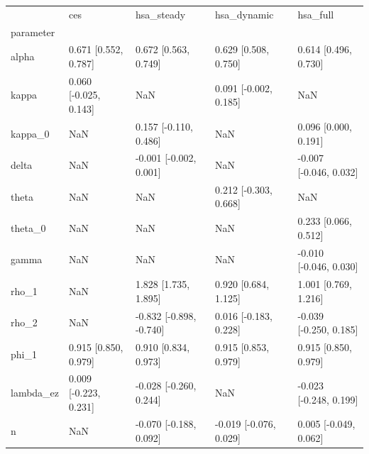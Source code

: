 \begin{tabular}{lllll}
\toprule
 & ces & hsa\_steady & hsa\_dynamic & hsa\_full \\
parameter &  &  &  &  \\
\midrule
alpha & 0.671 [0.552, 0.787] & 0.672 [0.563, 0.749] & 0.629 [0.508, 0.750] & 0.614 [0.496, 0.730] \\
kappa & 0.060 [-0.025, 0.143] & NaN & 0.091 [-0.002, 0.185] & NaN \\
kappa\_0 & NaN & 0.157 [-0.110, 0.486] & NaN & 0.096 [0.000, 0.191] \\
delta & NaN & -0.001 [-0.002, 0.001] & NaN & -0.007 [-0.046, 0.032] \\
theta & NaN & NaN & 0.212 [-0.303, 0.668] & NaN \\
theta\_0 & NaN & NaN & NaN & 0.233 [0.066, 0.512] \\
gamma & NaN & NaN & NaN & -0.010 [-0.046, 0.030] \\
rho\_1 & NaN & 1.828 [1.735, 1.895] & 0.920 [0.684, 1.125] & 1.001 [0.769, 1.216] \\
rho\_2 & NaN & -0.832 [-0.898, -0.740] & 0.016 [-0.183, 0.228] & -0.039 [-0.250, 0.185] \\
phi\_1 & 0.915 [0.850, 0.979] & 0.910 [0.834, 0.973] & 0.915 [0.853, 0.979] & 0.915 [0.850, 0.979] \\
lambda\_ez & 0.009 [-0.223, 0.231] & -0.028 [-0.260, 0.244] & NaN & -0.023 [-0.248, 0.199] \\
n & NaN & -0.070 [-0.188, 0.092] & -0.019 [-0.076, 0.029] & 0.005 [-0.049, 0.062] \\
\bottomrule
\end{tabular}
